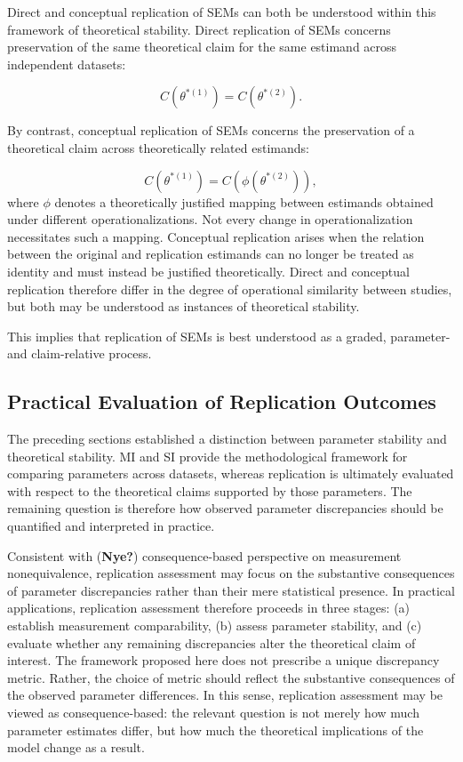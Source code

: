 \documentclass[
  12pt,
  letterpaper,
  man]{apa7}
\newcounter{none} %
\begin{document}
Direct and conceptual replication of SEMs can both be understood within
this framework of theoretical stability. Direct replication of SEMs
concerns preservation of the same theoretical claim for the same
estimand across independent datasets:

\[
C\left(\theta^{*(1)}\right) = C\left(\theta^{*(2)}\right).
\]

By contrast, conceptual replication of SEMs concerns the preservation of
a theoretical claim across theoretically related estimands:

\[
C\left(\theta^{*(1)}\right) = C\left(\phi\left(\theta^{*(2)}\right)\right),
\] where \(\phi\) denotes a theoretically justified mapping between
estimands obtained under different operationalizations. Not every change
in operationalization necessitates such a mapping. Conceptual
replication arises when the relation between the original and
replication estimands can no longer be treated as identity and must
instead be justified theoretically. Direct and conceptual replication
therefore differ in the degree of operational similarity between
studies, but both may be understood as instances of theoretical
stability.

This implies that replication of SEMs is best understood as a graded,
parameter- and claim-relative process.

\subsection{Practical Evaluation of Replication
Outcomes}\label{practical-evaluation-of-replication-outcomes}

The preceding sections established a distinction between parameter
stability and theoretical stability. MI and SI provide the
methodological framework for comparing parameters across datasets,
whereas replication is ultimately evaluated with respect to the
theoretical claims supported by those parameters. The remaining question
is therefore how observed parameter discrepancies should be quantified
and interpreted in practice.

Consistent with (\textbf{Nye?}) consequence-based perspective on
measurement nonequivalence, replication assessment may focus on the
substantive consequences of parameter discrepancies rather than their
mere statistical presence. In practical applications, replication
assessment therefore proceeds in three stages: (a) establish measurement
comparability, (b) assess parameter stability, and (c) evaluate whether
any remaining discrepancies alter the theoretical claim of interest. The
framework proposed here does not prescribe a unique discrepancy metric.
Rather, the choice of metric should reflect the substantive consequences
of the observed parameter differences. In this sense, replication
assessment may be viewed as consequence-based: the relevant question is
not merely how much parameter estimates differ, but how much the
theoretical implications of the model change as a result.
\end{document}
